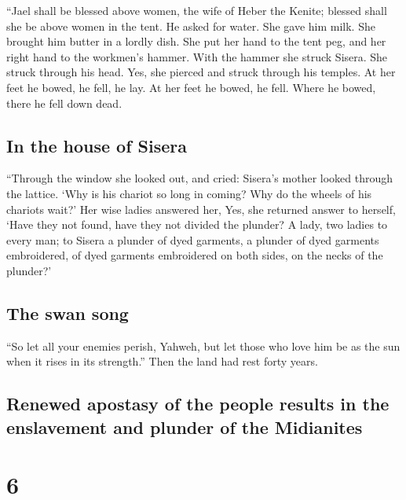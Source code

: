  ``Jael shall be blessed above women, the wife of Heber
the Kenite; blessed shall she be above women in the tent.
 He asked for water. She gave him milk. She brought him
butter in a lordly dish.  She put her hand to the tent
peg, and her right hand to the workmen's hammer. With the hammer she
struck Sisera. She struck through his head. Yes, she pierced and struck
through his temples.  At her feet he bowed, he fell, he
lay. At her feet he bowed, he fell. Where he bowed, there he fell down
dead.

\hypertarget{in-the-house-of-sisera}{%
\subsection{In the house of Sisera}\label{in-the-house-of-sisera}}

 ``Through the window she looked out, and cried: Sisera's
mother looked through the lattice. `Why is his chariot so long in
coming? Why do the wheels of his chariots wait?'  Her
wise ladies answered her, Yes, she returned answer to herself,
 `Have they not found, have they not divided the plunder?
A lady, two ladies to every man; to Sisera a plunder of dyed garments, a
plunder of dyed garments embroidered, of dyed garments embroidered on
both sides, on the necks of the plunder?'

\hypertarget{the-swan-song}{%
\subsection{The swan song}\label{the-swan-song}}

 ``So let all your enemies perish, Yahweh, but let those
who love him be as the sun when it rises in its strength.'' Then the
land had rest forty years.

\hypertarget{renewed-apostasy-of-the-people-results-in-the-enslavement-and-plunder-of-the-midianites}{%
\subsection{Renewed apostasy of the people results in the enslavement
and plunder of the
Midianites}\label{renewed-apostasy-of-the-people-results-in-the-enslavement-and-plunder-of-the-midianites}}

\hypertarget{section-5}{%
\section{6}\label{section-5}}

